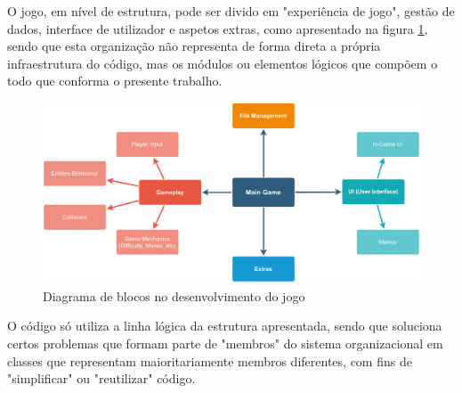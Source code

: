 \documentclass[a4paper,11pt]{article}
\begin{document}
      

        
                 
          
   
       
     
            
              
         
            
         
        
        
   
    
	
    

    









\begin{tabbing}
    
\end{tabbing}
O jogo, em nível de estrutura, pode ser divido em "experiência de jogo", gestão de dados, interface de utilizador e aspetos extras, como apresentado na figura \ref{fig:GameModulesDiagram}, sendo que esta organização não representa de forma direta a própria infraestrutura do código, mas os módulos ou elementos lógicos que compõem o todo que conforma o presente trabalho.

\vspace{8pt}

\begin{figure}[!ht]
    \centering
    \includegraphics[scale = 0.60]{2 - Esquemas/GameModulesDiagram.pdf}
    \caption{Diagrama de blocos no desenvolvimento do jogo}
    \label{fig:GameModulesDiagram}
\end{figure}

\vspace{8pt}

O código só utiliza a linha lógica da estrutura apresentada, sendo que soluciona certos problemas que formam parte de "membros" do sistema organizacional em classes que representam maioritariamente membros diferentes, com fins de "simplificar" ou "reutilizar" código.
\end{document}
